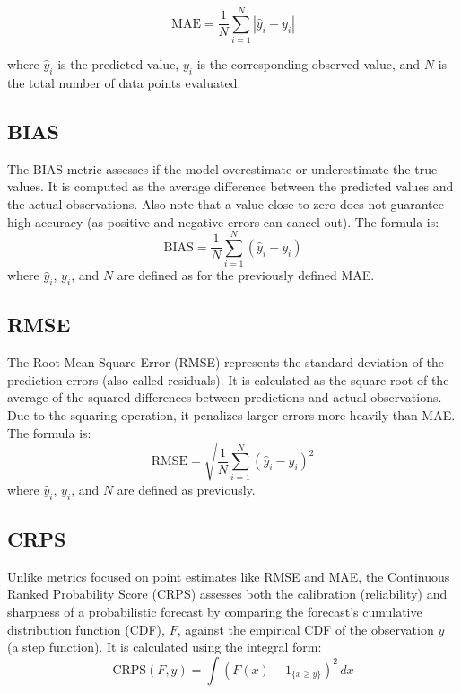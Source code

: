 \documentclass[12pt,a4paper]{book}
\begin{document}
\begin{equation}
\label{eq:mae}
\text{MAE} = \frac{1}{N} \sum_{i=1}^{N} | \hat{y}_i - y_i |
\end{equation}

where \( \hat{y}_i \) is the predicted value, \( y_i \) is the corresponding observed value, and \( N \) is the total number of data points evaluated.

\subsection{BIAS}
The BIAS metric assesses if the model overestimate or underestimate the true values. It is computed as the average difference between the predicted values and the actual observations. Also note that a value close to zero does not guarantee high accuracy (as positive and negative errors can cancel out). The formula is:
\begin{equation}
\label{eq:bias}
\text{BIAS} = \frac{1}{N} \sum_{i=1}^{N} (\hat{y}_i - y_i)
\end{equation}
where \( \hat{y}_i \), \( y_i \), and \( N \) are defined as for the previously defined MAE.

\subsection{RMSE}
The Root Mean Square Error (RMSE) represents the standard deviation of the prediction errors (also called residuals). It is calculated as the square root of the average of the squared differences between predictions and actual observations. Due to the squaring operation, it penalizes larger errors more heavily than MAE. The formula is:
\begin{equation}
\label{eq:rmse}
\text{RMSE} = \sqrt{\frac{1}{N} \sum_{i=1}^{N} (\hat{y}_i - y_i)^2}
\end{equation}
where \( \hat{y}_i \), \( y_i \), and \( N \) are defined as previously. 

\subsection{CRPS}
Unlike metrics focused on point estimates like RMSE and MAE, the Continuous Ranked Probability Score (CRPS) \citep{hersbach_decomposition_2000} assesses both the calibration (reliability) and sharpness of a probabilistic forecast by comparing the forecast's cumulative distribution function (CDF), \( F \), against the empirical CDF of the observation \( y \) (a step function). It is calculated using the integral form:
\[
\text{CRPS}(F,y) = \int (F(x) - 1_{\{x \geq y\}})^2 \, dx
\]
\end{document}
